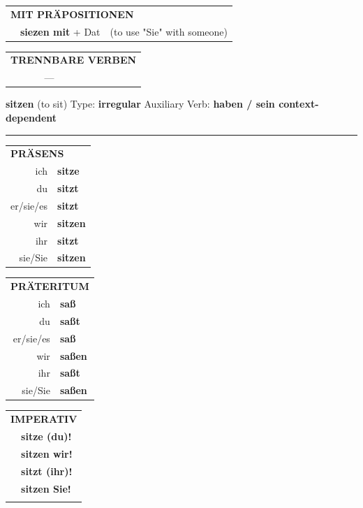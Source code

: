 \documentclass[10pt,a4paper]{revtex4-2}
\begin{document}
\begin{verbbox}
\vspace{10pt}

\begin{tabular}{lll}
\multicolumn{3}{l}{\textbf{MIT PRÄPOSITIONEN}}\\
& \textbf{siezen mit} + Dat & (to use "Sie" with someone)\\
\end{tabular}
\hfill
\begin{tabular}{lll}
\multicolumn{3}{l}{\textbf{TRENNBARE VERBEN}}\\
& ---\\
\end{tabular}
\vspace{-5pt}
\end{verbbox}

\begin{verbbox}
    {\Large \bf sitzen} (to sit) \hfill Type: \textbf{irregular} \hfill Auxiliary Verb: \textbf{haben / sein context-dependent} 
    
     \vspace{5pt}

    \hrule
    
    \vspace{5pt}

  \begin{tabular}{rl}
     \multicolumn{2}{l}{\textbf{PRÄSENS} }\\
    ich & \textbf{sitze}\\
    du & \textbf{sitzt}\\
    er/sie/es & \textbf{sitzt}\\
    wir & \textbf{sitzen}\\
    ihr & \textbf{sitzt}\\
    sie/Sie & \textbf{sitzen}\\
  \end{tabular}
  \hfill
  \begin{tabular}{rl}
    \multicolumn{2}{l}{\textbf{PRÄTERITUM} }\\
    ich & \textbf{saß}\\
    du & \textbf{saßt}\\
    er/sie/es & \textbf{saß}\\
    wir & \textbf{saßen}\\
    ihr & \textbf{saßt}\\
    sie/Sie & \textbf{saßen}\\
  \end{tabular}
  \hfill
  \begin{tabular}{rl}
     \multicolumn{2}{l}{\textbf{IMPERATIV} }\\
   & \textbf{sitze (du)!}\\
   & \textbf{sitzen wir!}\\
   & \textbf{sitzt (ihr)!}\\
   & \textbf{sitzen Sie!}\\
   & \vspace{10pt}
  \end{tabular}


\end{verbbox}
\end{document}

